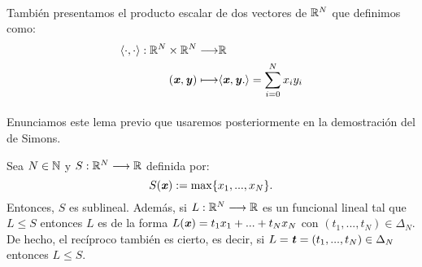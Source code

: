 	\paragraph{} También presentamos el producto escalar de dos vectores de $ \mathbb{R}^N $ que definimos como:
	\[
	\begin{split}
	\langle \cdot, \cdot \rangle : \mathbb{R}^N \times \mathbb{R}^N \longrightarrow &\mathbb{R} \\
	(\textbf{\emph{x}}, \textbf{\emph{y}}) \longmapsto &\langle \textbf{\emph{x}}, \textbf{\emph{y}}. \rangle = \sum_{i=0}^{N}x_iy_i
	\end{split}
	\]
	\paragraph{}Enunciamos este lema previo que usaremos posteriormente en la demostración del de Simons.
	\begin{lemaBox}\label{lema2.1}
		Sea $ N \in \mathbb{N} $ y $ S: \mathbb{R}^N \longrightarrow \mathbb{R} $ definida por: \[ S(\textbf{\emph{x}}):=\max\{x_1,...,x_N\}.\] Entonces, $ S $ es sublineal. Además, si $ L:\mathbb{R}^N \longrightarrow \mathbb{R} $ es un funcional lineal tal que $ L \leq S $ entonces $ L $ es de la forma $ L(\textbf{\emph{x}}) = t_1 x_1 + ... + t_N x_N $ con $ (t_1,...,t_N) \in \Delta_N$. De hecho, el recíproco también es cierto, es decir, si $ L = \textbf{\emph{t}} = (t_1,...,t_N) \in \Delta_N $ entonces $ L \leq S $.
		
		
	\end{lemaBox}
